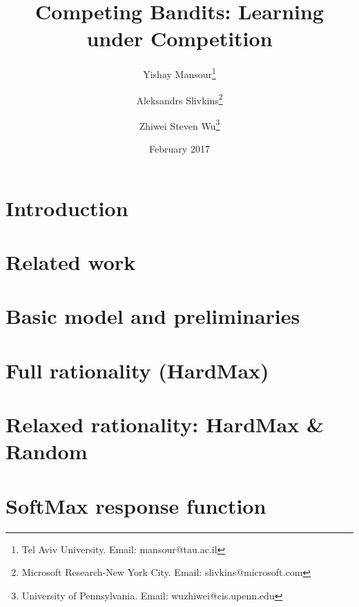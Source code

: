 \documentclass[11pt]{article}
\begin{document}
\title{Competing Bandits: Learning under Competition}


\author{Yishay Mansour\thanks{Tel Aviv University. Email: mansour@tau.ac.il}
 \and Aleksandrs Slivkins\thanks{Microsoft Research-New York City. Email: slivkins@microsoft.com}
 \and Zhiwei Steven Wu\thanks{University of Pennsylvania. Email: wuzhiwei@cis.upenn.edu} }

\date{February 2017}


\maketitle

\begin{abstract}

\end{abstract}


\section{Introduction}
\label{sec:intro}


\section{Related work}
\label{sec:related-work}



\section{Basic model and preliminaries}
\label{sec:model}


\section{Full rationality (HardMax)}
\label{sec:rational}


\section{Relaxed rationality: HardMax \& Random}
\label{sec:random}


\section{SoftMax response function}
\label{sec:soft}

\end{document}
